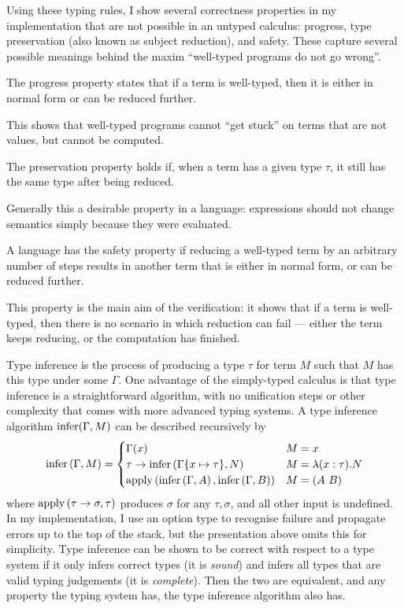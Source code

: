 Using these typing rules, I show several correctness properties in my implementation that are not possible in an untyped calculus: progress, type preservation (also known as subject reduction), and safety.
These capture several possible meanings behind the maxim ``well-typed programs do not go wrong''.

\begin{definition}
The progress property states that if a term is well-typed, then it is either in normal form or can be reduced further.
\end{definition}

This shows that well-typed programs cannot ``get stuck'' on terms that are not values, but cannot be computed.

\begin{definition}
The preservation property holds if, when a term has a given type \(\tau\), it still has the same type after being reduced.
\end{definition}

Generally this a desirable property in a language: expressions should not change semantics simply because they were evaluated.

\begin{definition}
A language has the safety property if reducing a well-typed term by an arbitrary number of steps results in another term that is either in normal form, or can be reduced further.
\end{definition}

This property is the main aim of the verification: it shows that if a term is well-typed, then there is no scenario in which reduction can fail --- either the term keeps reducing, or the computation has finished.

Type inference is the process of producing a type \(\tau\) for term \(M\) such that \(M\) has this type under some \(\Gamma\).
One advantage of the simply-typed calculus is that type inference is a straightforward algorithm, with no unification steps or other complexity that comes with more advanced typing systems.
A type inference algorithm \(\mathrm{infer}(\Gamma, M)\) can be described recursively by
\[
\mathrm{infer}\left(\Gamma, M\right) =
\begin{cases}
\Gamma(x) & M = x\\
\tau \to \mathrm{infer}\left(\Gamma\{x \mapsto \tau\}, N\right) & M = \lambda (x : \tau). N\\
\mathrm{apply}\left(\mathrm{infer}\left(\Gamma, A\right), \mathrm{infer}\left(\Gamma, B\right)\right) & M = \left(A\ B\right)
\end{cases}
\]
where \(\mathrm{apply}\left(\tau \to \sigma, \tau\right)\) produces \(\sigma\) for any \(\tau, \sigma\), and all other input is undefined.
In my implementation, I use an option type to recognise failure and propagate errors up to the top of the stack, but the presentation above omits this for simplicity.
Type inference can be shown to be correct with respect to a type system if it only infers correct types (it is \emph{sound}) and infers all types that are valid typing judgements (it is \emph{complete}).
Then the two are equivalent, and any property the typing system has, the type inference algorithm also has.

